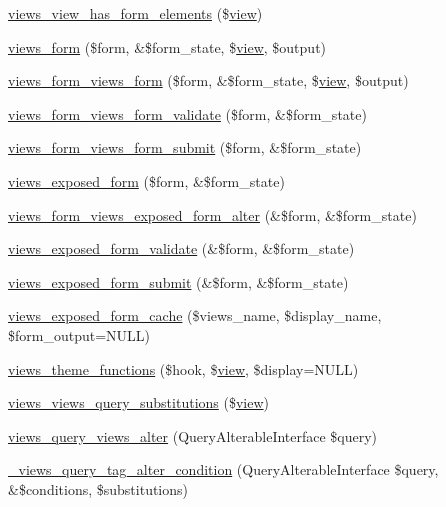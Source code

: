 \begin{DoxyCompactItemize}
\item 
\hyperlink{views_8module_a5e3621086e4f50ae1e7cfe14392c6bca}{views\_\-view\_\-has\_\-form\_\-elements} (\$\hyperlink{classview}{view})
\item 
\hyperlink{views_8module_ad2b3623cab717e77713170df21927c92}{views\_\-form} (\$form, \&\$form\_\-state, \$\hyperlink{classview}{view}, \$output)
\item 
\hyperlink{views_8module_a0597f9e730eb438da7c5e91eb9eec685}{views\_\-form\_\-views\_\-form} (\$form, \&\$form\_\-state, \$\hyperlink{classview}{view}, \$output)
\item 
\hyperlink{views_8module_a1d7ebdb64055b2c813237617e8be7241}{views\_\-form\_\-views\_\-form\_\-validate} (\$form, \&\$form\_\-state)
\item 
\hyperlink{views_8module_a7fbf15fdfa7d026d5d8735d86d1c3fcf}{views\_\-form\_\-views\_\-form\_\-submit} (\$form, \&\$form\_\-state)
\item 
\hyperlink{views_8module_a73e0d571664dc78bbddc65be02bc0a2e}{views\_\-exposed\_\-form} (\$form, \&\$form\_\-state)
\item 
\hyperlink{views_8module_a1b2f933056d6e97e743b462d39e1d535}{views\_\-form\_\-views\_\-exposed\_\-form\_\-alter} (\&\$form, \&\$form\_\-state)
\item 
\hyperlink{views_8module_aabe2634331d3b98e6f229d3392d2b5ce}{views\_\-exposed\_\-form\_\-validate} (\&\$form, \&\$form\_\-state)
\item 
\hyperlink{views_8module_a931d81415d29b2c8bb3ec3a2e9edbfea}{views\_\-exposed\_\-form\_\-submit} (\&\$form, \&\$form\_\-state)
\item 
\hyperlink{views_8module_a5db0d5532dfe2507275360e0738e4d64}{views\_\-exposed\_\-form\_\-cache} (\$views\_\-name, \$display\_\-name, \$form\_\-output=NULL)
\item 
\hyperlink{views_8module_a5c5e28542b853cf61c0540d05d057e40}{views\_\-theme\_\-functions} (\$hook, \$\hyperlink{classview}{view}, \$display=NULL)
\item 
\hyperlink{views_8module_af14b36b042237ca5f054fc19c44a188c}{views\_\-views\_\-query\_\-substitutions} (\$\hyperlink{classview}{view})
\item 
\hyperlink{views_8module_a621a7deea033fadbb8de49ef7795a8b7}{views\_\-query\_\-views\_\-alter} (QueryAlterableInterface \$query)
\item 
\hyperlink{views_8module_a51cb108c148c7478b50e6262e216a17d}{\_\-views\_\-query\_\-tag\_\-alter\_\-condition} (QueryAlterableInterface \$query, \&\$conditions, \$substitutions)

\end{DoxyCompactItemize}
